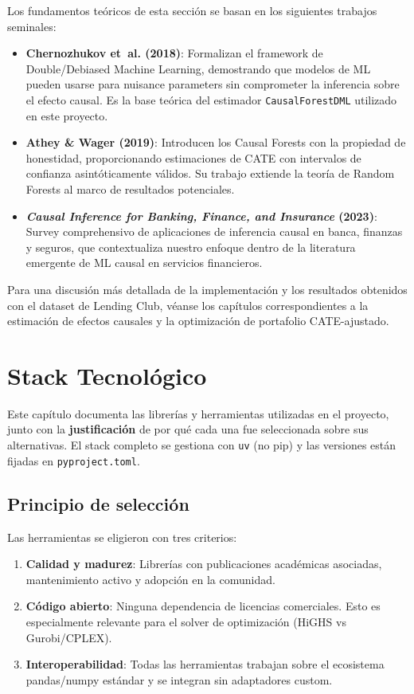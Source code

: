 \documentclass[
  spanish,
  11pt,
  letterpaper,
]{scrbook}
\providecommand{\tightlist}{%
  \setlength{\itemsep}{0pt}\setlength{\parskip}{0pt}}
\theoremstyle{plain}
\theoremstyle{remark}
\begin{document}
Los fundamentos teóricos de esta sección se basan en los siguientes
trabajos seminales:

\begin{itemize}
\item
  \textbf{{Chernozhukov et~al.} (2018)}: Formalizan el framework de
  Double/Debiased Machine Learning, demostrando que modelos de ML pueden
  usarse para nuisance parameters sin comprometer la inferencia sobre el
  efecto causal. Es la base teórica del estimador
  \texttt{CausalForestDML} utilizado en este proyecto.
\item
  \textbf{Athey \& Wager (2019)}: Introducen los Causal Forests con la
  propiedad de honestidad, proporcionando estimaciones de CATE con
  intervalos de confianza asintóticamente válidos. Su trabajo extiende
  la teoría de Random Forests al marco de resultados potenciales.
\item
  \textbf{\emph{Causal Inference for Banking, Finance, and Insurance}
  (2023)}: Survey comprehensivo de aplicaciones de inferencia causal en
  banca, finanzas y seguros, que contextualiza nuestro enfoque dentro de
  la literatura emergente de ML causal en servicios financieros.
\end{itemize}

Para una discusión más detallada de la implementación y los resultados
obtenidos con el dataset de Lending Club, véanse los capítulos
correspondientes a la estimación de efectos causales y la optimización
de portafolio CATE-ajustado.

\chapter{Stack Tecnológico}\label{stack-tecnoluxf3gico}

Este capítulo documenta las librerías y herramientas utilizadas en el
proyecto, junto con la \textbf{justificación} de por qué cada una fue
seleccionada sobre sus alternativas. El stack completo se gestiona con
\texttt{uv} (no pip) y las versiones están fijadas en
\texttt{pyproject.toml}.

\section{Principio de selección}\label{principio-de-selecciuxf3n}

Las herramientas se eligieron con tres criterios:

\begin{enumerate}
\def\labelenumi{\arabic{enumi}.}
\tightlist
\item
  \textbf{Calidad y madurez}: Librerías con publicaciones académicas
  asociadas, mantenimiento activo y adopción en la comunidad.
\item
  \textbf{Código abierto}: Ninguna dependencia de licencias comerciales.
  Esto es especialmente relevante para el solver de optimización (HiGHS
  vs Gurobi/CPLEX).
\item
  \textbf{Interoperabilidad}: Todas las herramientas trabajan sobre el
  ecosistema pandas/numpy estándar y se integran sin adaptadores custom.
\end{enumerate}
\end{document}
